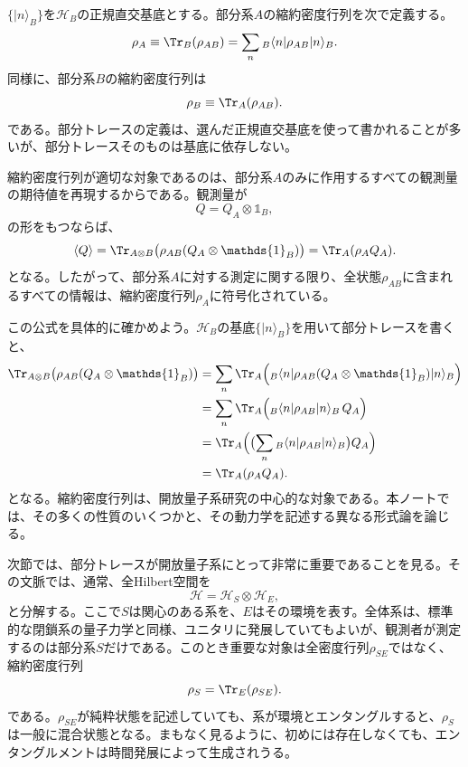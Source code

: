 \documentclass[a4paper,11pt,oneside]{article}
\theoremstyle{definition}
\numberwithin{equation}{section}
\begin{document}
$\{|n\rangle_B\}$を$\mathcal H_B$の正規直交基底とする。部分系$A$の縮約密度行列を次で定義する。
\begin{equation}
\rho_A \equiv \Tr_B(\rho_{AB})
=
\sum_n {}_B\langle n| \rho_{AB} |n\rangle_B .
\end{equation}
同様に、部分系$B$の縮約密度行列は
\begin{equation}
\rho_B \equiv \Tr_A(\rho_{AB}) .
\end{equation}
である。部分トレースの定義は、選んだ正規直交基底を使って書かれることが多いが、部分トレースそのものは基底に依存しない。



縮約密度行列が適切な対象であるのは、部分系$A$のみに作用するすべての観測量の期待値を再現するからである。観測量が
\begin{equation}
Q = Q_A \otimes \mathds{1} _B ,
\end{equation}
の形をもつならば、
\begin{equation}
\langle Q\rangle
=
\Tr_{A\otimes B}\bigl(\rho_{AB}(Q_A\otimes \mathds{1} _B)\bigr)
=
\Tr_A(\rho_A Q_A) .
\end{equation}
となる。したがって、部分系$A$に対する測定に関する限り、全状態$\rho_{AB}$に含まれるすべての情報は、縮約密度行列$\rho_A$に符号化されている。



この公式を具体的に確かめよう。$\mathcal H_B$の基底$\{|n\rangle_B\}$を用いて部分トレースを書くと、
\begin{align}
\Tr_{A\otimes B}\bigl(\rho_{AB}(Q_A\otimes \mathds{1} _B)\bigr)
&=
\sum_n
\Tr_A\Bigl(
{}_B\langle n|
\rho_{AB}(Q_A\otimes \mathds{1} _B)
|n\rangle_B
\Bigr)
\nonumber\\
&=
\sum_n
\Tr_A\Bigl(
{}_B\langle n|\rho_{AB}|n\rangle_B \, Q_A
\Bigr)
\nonumber\\
&=
\Tr_A\Bigl(
\bigl(\sum_n {}_B\langle n|\rho_{AB}|n\rangle_B\bigr) Q_A
\Bigr)
\nonumber\\
&=
\Tr_A(\rho_A Q_A) .
\end{align}
となる。縮約密度行列は、開放量子系研究の中心的な対象である。本ノートでは、その多くの性質のいくつかと、その動力学を記述する異なる形式論を論じる。




次節では、部分トレースが開放量子系にとって非常に重要であることを見る。その文脈では、通常、全Hilbert空間を
\begin{equation}
\mathcal H = \mathcal H_S \otimes \mathcal H_E ,
\end{equation}
と分解する。ここで$S$は関心のある系を、$E$はその環境を表す。全体系は、標準的な閉鎖系の量子力学と同様、ユニタリに発展していてもよいが、観測者が測定するのは部分系$S$だけである。このとき重要な対象は全密度行列$\rho_{SE}$ではなく、縮約密度行列
\begin{equation}
\rho_S = \Tr_E(\rho_{SE}) .
\end{equation}
である。$\rho_{SE}$が純粋状態を記述していても、系が環境とエンタングルすると、$\rho_S$は一般に混合状態となる。まもなく見るように、初めには存在しなくても、エンタングルメントは時間発展によって生成されうる。
\end{document}
